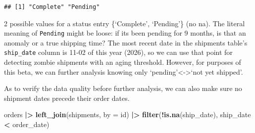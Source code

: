 \documentclass[
]{article}
\newenvironment{Shaded}{\begin{snugshade}}{\end{snugshade}}
\newcommand{\AttributeTok}[1]{\textcolor[rgb]{0.13,0.29,0.53}{#1}}
\newcommand{\FunctionTok}[1]{\textcolor[rgb]{0.13,0.29,0.53}{\textbf{#1}}}
\newcommand{\NormalTok}[1]{#1}
\newcommand{\SpecialCharTok}[1]{\textcolor[rgb]{0.81,0.36,0.00}{\textbf{#1}}}
\newcommand{\StringTok}[1]{\textcolor[rgb]{0.31,0.60,0.02}{#1}}
\begin{document}
\begin{verbatim}
## [1] "Complete" "Pending"
\end{verbatim}

2 possible values for a status entry \{`Complete', `Pending'\} (no na).
The literal meaning of \texttt{Pending} might be loose: if its been
pending for 9 months, is that an anomaly or a true shipping time? The
most recent date in the shipments table's \texttt{ship\_date} column is
11-02 of this year (2026), so we can use that point for detecting zombie
shipments with an aging threshold. However, for purposes of this beta,
we can further analysis knowing only
`pending'\textless-\textgreater{}`not yet shipped'.

As to verify the data quality before further analysis, we can also make
sure no shipment dates precede their order dates.

\begin{Shaded}
\begin{Highlighting}[]
\NormalTok{orders }\SpecialCharTok{|\textgreater{}}
  \FunctionTok{left\_join}\NormalTok{(shipments, }\AttributeTok{by =} \StringTok{\textquotesingle{}id\textquotesingle{}}\NormalTok{) }\SpecialCharTok{|\textgreater{}}
  \FunctionTok{filter}\NormalTok{(}\SpecialCharTok{!}\FunctionTok{is.na}\NormalTok{(ship\_date), ship\_date }\SpecialCharTok{\textless{}}\NormalTok{ order\_date)}
\end{Highlighting}
\end{Shaded}
\end{document}
